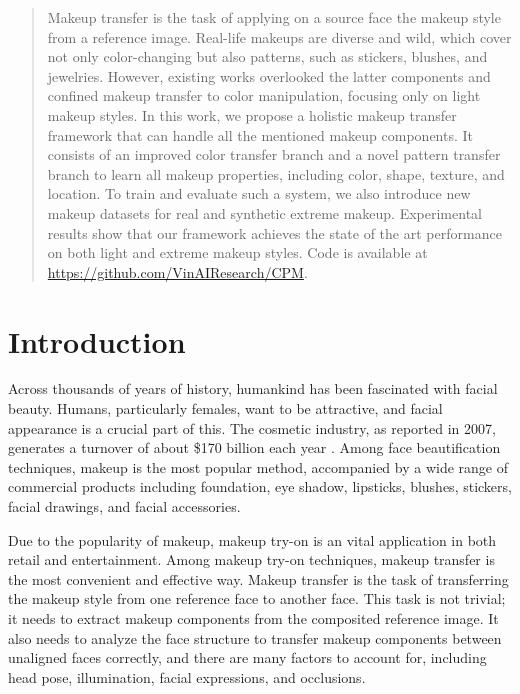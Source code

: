 \documentclass[final]{cvpr}
\begin{document}
\maketitle
\begin{abstract}
Makeup transfer is the task of applying on a source face the makeup style from a reference image. Real-life makeups are diverse and wild, which cover not only color-changing but also patterns, such as stickers, blushes, and jewelries. However, existing works overlooked the latter components and confined makeup transfer to color manipulation, focusing only on light makeup styles. In this work, we propose a holistic makeup transfer framework that can handle all the mentioned makeup components. It consists of an improved color transfer branch and a novel pattern transfer branch to learn all makeup properties, including color, shape, texture, and location. To train and evaluate such a system, we also introduce new makeup datasets for real and synthetic extreme makeup. Experimental results show that our framework achieves the state of the art performance on both light and extreme makeup styles. Code is available at \url{https://github.com/VinAIResearch/CPM}.
   
\end{abstract}


\section{Introduction}
\vspace{-2mm}



Across thousands of years of history, humankind has been fascinated with facial beauty. Humans, particularly females, want to be attractive, and facial appearance is a crucial part of this. The cosmetic industry, as reported in 2007, generates a turnover of about \$170 billion each year \cite{cosmeticWiki}. Among face beautification techniques, makeup is the most popular method, accompanied by a wide range of commercial products including foundation, eye shadow, lipsticks, blushes, stickers, facial drawings, and facial accessories.


Due to the popularity of makeup, makeup try-on is an vital application in both retail and entertainment. Among makeup try-on techniques, makeup transfer is the most convenient and effective way. Makeup transfer is the task of transferring the makeup style from one reference face to another face. This task is not trivial; it needs to extract makeup components from the composited reference image. It also needs to analyze the face structure to transfer makeup components between unaligned faces correctly, and there are many factors to account for, including head pose, illumination, facial expressions, and occlusions.
\end{document}
